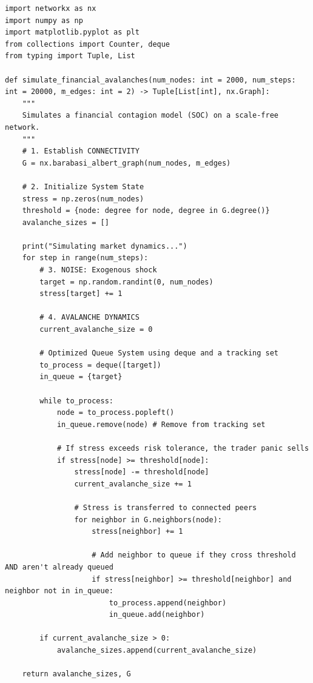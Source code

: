 \documentclass[final,5p,times,twocolumn,authoryear]{elsarticle}
\begin{document}
\begin{lstlisting}[caption={Optimized Python Simulation of Financial Self-Organized Criticality}, label={code:simulation}]
import networkx as nx
import numpy as np
import matplotlib.pyplot as plt
from collections import Counter, deque
from typing import Tuple, List

def simulate_financial_avalanches(num_nodes: int = 2000, num_steps: int = 20000, m_edges: int = 2) -> Tuple[List[int], nx.Graph]:
    """
    Simulates a financial contagion model (SOC) on a scale-free network.
    """
    # 1. Establish CONNECTIVITY
    G = nx.barabasi_albert_graph(num_nodes, m_edges)
    
    # 2. Initialize System State
    stress = np.zeros(num_nodes)
    threshold = {node: degree for node, degree in G.degree()}
    avalanche_sizes = []

    print("Simulating market dynamics...")
    for step in range(num_steps):
        # 3. NOISE: Exogenous shock
        target = np.random.randint(0, num_nodes)
        stress[target] += 1
        
        # 4. AVALANCHE DYNAMICS
        current_avalanche_size = 0
        
        # Optimized Queue System using deque and a tracking set
        to_process = deque([target])
        in_queue = {target}
        
        while to_process:
            node = to_process.popleft()
            in_queue.remove(node) # Remove from tracking set
            
            # If stress exceeds risk tolerance, the trader panic sells
            if stress[node] >= threshold[node]:
                stress[node] -= threshold[node] 
                current_avalanche_size += 1
                
                # Stress is transferred to connected peers
                for neighbor in G.neighbors(node):
                    stress[neighbor] += 1
                    
                    # Add neighbor to queue if they cross threshold AND aren't already queued
                    if stress[neighbor] >= threshold[neighbor] and neighbor not in in_queue:
                        to_process.append(neighbor)
                        in_queue.add(neighbor)
                        
        if current_avalanche_size > 0:
            avalanche_sizes.append(current_avalanche_size)
            
    return avalanche_sizes, G


\end{lstlisting}
\end{document}
